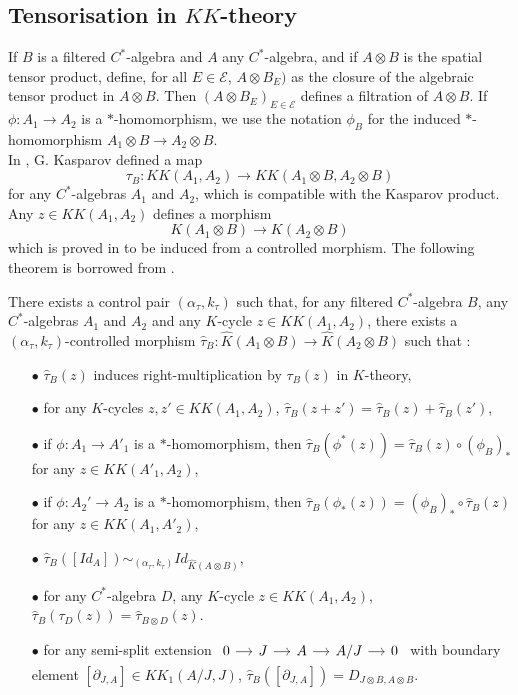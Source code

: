 \subsection{Tensorisation in $KK$-theory}

If $B$ is a filtered $C^*$-algebra and $A$ any $C^*$-algebra, and if $A\otimes B$ is the spatial tensor product, define, for all $E\in \mathcal E$, $A\otimes B_E)$ as the closure of the algebraic tensor product in $A\otimes B$. Then $(A\otimes B_E)_{E\in\mathcal E}$ defines a filtration of $A\otimes B$. If $\phi : A_1 \rightarrow A_2$ is a $*$-homomorphism, we use the notation $\phi_B$ for the induced $*$-homomorphism $A_1\otimes B\rightarrow A_2\otimes B$. \\

In \cite{kasparovKKNovikov}, G. Kasparov defined a map
\[\tau_B : KK(A_1,A_2)\rightarrow KK(A_1\otimes B, A_2\otimes B)\]
for any $C^*$-algebras $A_1$ and $A_2$, which is compatible with the Kasparov product. Any $z\in KK(A_1,A_2)$ defines a morphism
\[K(A_1\otimes B)\rightarrow K(A_2\otimes B)\]
which is proved in \cite{OY2} to be induced from a controlled morphism. The following theorem is borrowed from \cite{OY2}.\\

\begin{thm}\label{tensorization}
There exists a control pair $(\alpha_\tau,k_\tau)$ such that, for any filtered $C^*$-algebra $B$, any $C^*$-algebras $A_1$ and $A_2$ and any $K$-cycle $z\in KK(A_1,A_2)$, there exists a $(\alpha_\tau,k_\tau)$-controlled morphism $\hat \tau_B : \hat K(A_1\otimes B)\rightarrow \hat K(A_2\otimes B)$
such that :
\begin{itemize}
\item[$\bullet$] $\hat \tau_B(z)$ induces right-multiplication by $\tau_B(z)$ in $K$-theory,
\item[$\bullet$] for any $K$-cycles $z,z'\in KK(A_1,A_2)$, $\hat \tau_B(z+z')=\hat\tau_B(z)+\hat\tau_B(z')$,
\item[$\bullet$] if $\phi : A_1\rightarrow A'_1$ is a $*$-homomorphism, then $\hat\tau_B(\phi^*(z)) =  \hat\tau_B(z)\circ (\phi_B)_*$ for any $z\in KK(A'_1,A_2)$,
\item[$\bullet$] if $\phi : A_2'\rightarrow A_2$ is a $*$-homomorphism, then $\hat\tau_B(\phi_*(z)) = (\phi_B)_*\circ \hat\tau_B(z)$ for any $z\in KK(A_1,A'_2)$,
\item[$\bullet$] $\hat \tau_B([Id_A])\sim_{(\alpha_\tau,k_\tau)} Id_{\hat K(A\otimes B)}$,
\item[$\bullet$] for any $C^*$-algebra $D$, any $K$-cycle $z\in KK(A_1,A_2)$, $\hat\tau_B (\tau_D(z))= \hat\tau_{B\otimes D}(z)$.
\item[$\bullet$] for any semi-split extension $\begin{tikzcd}[column sep = small] 0 \arrow{r}& J \arrow{r} & A \arrow{r} & A/J\arrow{r} & 0\end{tikzcd}$ with boundary element $[\partial_{J,A}]\in KK_1(A/J,J)$, $\hat\tau_B([\partial_{J,A}])=D_{J\otimes B,A\otimes B}$.
\end{itemize}
\end{thm}

